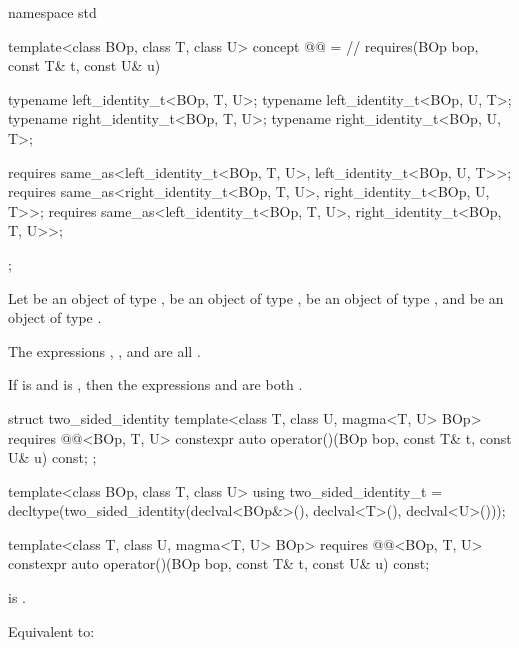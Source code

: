 \begin{itemdecl}
namespace std {
  template<class BOp, class T, class U>
  concept @@ = // \expos
    requires(BOp bop, const T& t, const U& u) {
       typename left_identity_t<BOp, T, U>;
       typename left_identity_t<BOp, U, T>;
       typename right_identity_t<BOp, T, U>;
       typename right_identity_t<BOp, U, T>;

       requires same_as<left_identity_t<BOp, T, U>, left_identity_t<BOp, U, T>>;
       requires same_as<right_identity_t<BOp, T, U>, right_identity_t<BOp, U, T>>;
       requires same_as<left_identity_t<BOp, T, U>, right_identity_t<BOp, T, U>>;
    };
}
\end{itemdecl}
\begin{itemdescr}
   \pnum
   Let  be an object of type ,  be an
   object of type ,  be an object of type
   , and  be an object of type
   .

   \pnum
   The expressions , , and
    are all .

   \pnum
   If  is  and  is
   , then the expressions  and
    are both .
\end{itemdescr}

\begin{itemdecl}
  struct two_sided_identity {
     template<class T, class U, magma<T, U> BOp>
     requires @@<BOp, T, U>
     constexpr auto operator()(BOp bop, const T& t, const U& u) const;
  };

  template<class BOp, class T, class U>
  using two_sided_identity_t =
    decltype(two_sided_identity{}(declval<BOp&>(), declval<T>(), declval<U>()));
\end{itemdecl}

\begin{itemdecl}
template<class T, class U, magma<T, U> BOp>
requires @@<BOp, T, U>
constexpr auto operator()(BOp bop, const T& t, const U& u) const;
\end{itemdecl}
\begin{itemdescr}
   \pnum
   \expects {} is .

   \pnum
   \effects Equivalent to:
   \begin{codeblock}
      return static_cast<std::common_type_t<T, U>>(left_identity{bop, t, u}());}
   \end{codeblock}
\end{itemdescr}

